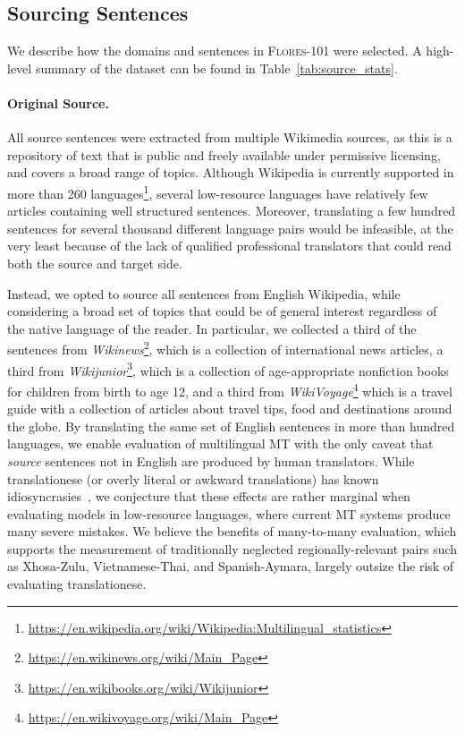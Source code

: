 \subsection{Sourcing Sentences} 
\label{sec:sourcing}

We describe how the domains and sentences in \textsc{Flores-101} were selected. A high-level summary of the dataset can be found in Table~\ref{tab:source_stats}.

\paragraph{Original Source.} All source sentences were extracted from multiple Wikimedia sources, as this is a repository of text that is public and freely available under permissive licensing, and covers a broad range of topics. Although Wikipedia is currently supported in more than 260
languages\footnote{\url{https://en.wikipedia.org/wiki/Wikipedia:Multilingual_statistics}}, several low-resource languages have relatively few articles containing well structured sentences. Moreover, translating a few hundred sentences for several thousand different language pairs would be infeasible, at the very least because of the lack of qualified professional translators that could read both the source and target side.

Instead, we opted to source all sentences from English Wikipedia, while considering a broad set of topics that could be of general interest regardless of the native language of the reader. In particular, we collected a third of the sentences from \textit{Wikinews}\footnote{\url{https://en.wikinews.org/wiki/Main_Page}}, which is a collection of international news articles, a third from \textit{Wikijunior}\footnote{\url{https://en.wikibooks.org/wiki/Wikijunior}}, which is a collection of age-appropriate nonfiction books for children from birth to age 12, and a third from   \textit{WikiVoyage}\footnote{\url{https://en.wikivoyage.org/wiki/Main_Page}} which is a travel guide with a collection of articles about travel tips, food and destinations around the globe. By translating the same set of English sentences in more than hundred languages, we enable evaluation of multilingual MT with the only caveat that \textit{source} sentences not in English are produced by human translators. While translationese (or overly literal or awkward translations) has known idiosyncrasies~\citep{zhang-toral-2019-effect}, we conjecture that these effects are rather marginal when evaluating models in low-resource languages, where current MT systems produce many severe mistakes. We believe the benefits of many-to-many evaluation, which supports the measurement of traditionally neglected regionally-relevant pairs such as Xhosa-Zulu, Vietnamese-Thai, and Spanish-Aymara, largely outsize the risk of evaluating translationese.

